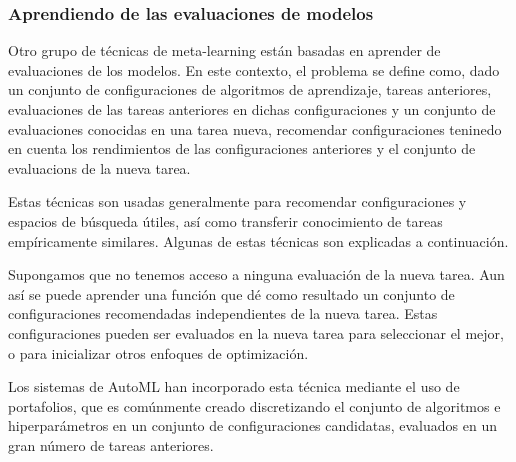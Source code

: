 \documentclass[a4paper,10pt,twocolumn]{article}
\begin{document}
\subsubsection{Aprendiendo de las evaluaciones de modelos}\label{subsec:mtl_automl_evaluations}

Otro grupo de técnicas de meta-learning están basadas en aprender de evaluaciones de los modelos. En este contexto, el problema se define como, dado un conjunto de configuraciones de algoritmos de aprendizaje, tareas anteriores, evaluaciones de las tareas anteriores en dichas configuraciones y un conjunto de evaluaciones conocidas en una tarea nueva, recomendar configuraciones teninedo en cuenta los rendimientos de las configuraciones anteriores y el conjunto de evaluacions de la nueva tarea.

Estas técnicas son usadas generalmente para recomendar configuraciones y espacios de búsqueda útiles, así como transferir conocimiento de tareas empíricamente similares. Algunas de estas técnicas son explicadas a continuación. 

Supongamos que no tenemos acceso a ninguna evaluación de la nueva tarea. Aun así se puede aprender una función que dé como resultado un conjunto de configuraciones recomendadas independientes de la nueva tarea. Estas configuraciones pueden ser evaluados en la nueva tarea para seleccionar el mejor, o para inicializar otros enfoques de optimización.

Los sistemas de AutoML han incorporado esta técnica mediante el uso de portafolios, que es comúnmente creado discretizando el conjunto de algoritmos e hiperparámetros en un conjunto de configuraciones candidatas, evaluados en un gran número de tareas anteriores.
\end{document}
